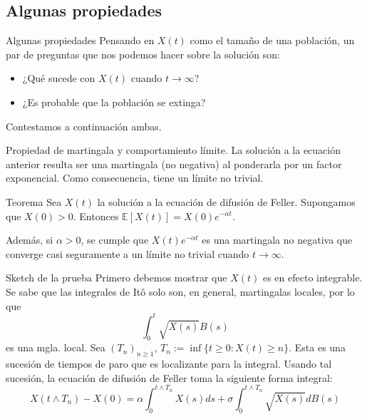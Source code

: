 \documentclass{beamer}
\renewcommand{\to}{\rightarrow}
\newcommand{\E}{\mathbb{E}}
\renewcommand{\1}{\mathds{1}}
\theoremstyle{definition}
\theoremstyle{definition}
\theoremstyle{definition}
\theoremstyle{definition}
\theoremstyle{definition}
\begin{document}
\subsection[Algunas propiedades]{Algunas propiedades}
\begin{frame}{Algunas propiedades}
    Pensando en $X(t)$ como el tamaño de una población, un par de preguntas que nos podemos hacer 
    sobre la solución son:
    \newline

    \begin{itemize}
        \item ¿Qué sucede con $X(t)$ cuando $t\to \infty$?
        \item ¿Es probable que la población se extinga?
        \newline

    \end{itemize}

    Contestamos a continuación ambas.
\end{frame}
\begin{frame}{Propiedad de martingala y comportamiento límite.}
    La solución a la ecuación anterior resulta ser una martingala (no negativa) al ponderarla
    por un factor exponencial. Como consecuencia, tiene un límite no trivial.
    \newline

    \begin{block}{Teorema}
        Sea $X(t)$ la solución a la ecuación de difusión de Feller. Supongamos que $X(0)>0$. Entonces 
        $\E\left[X(t)\right]=X(0)e^{-\alpha t}$.
        \newline

        Además, si $\alpha>0$, se cumple que $X(t)e^{-\alpha t}$ es una martingala 
        no negativa que converge casi seguramente a un límite no trivial cuando $t\longrightarrow \infty$.
    \end{block}
\end{frame}
\begin{frame}{Sketch de la prueba}
    Primero debemos mostrar que $X(t)$ es en efecto integrable. Se sabe que las integrales de Itô solo son, en general, 
    martingalas locales, por lo que 
    \[
        \int_{0}^{t} \sqrt{X(s)}B(s)
    \]
    es una mgla. local. Sea $(T_n)_{n\geq1}$, $T_n:=\inf\{t\geq0:X(t)\geq n\}$. Esta es una sucesión de 
    tiempos de paro que es localizante para la integral. Usando tal sucesión, la ecuación de difusión de 
    Feller toma la siguiente forma integral:
    \[
    X(t\wedge T_n)-X(0)=\alpha\int_0^{t\wedge T_n}X(s)ds+\sigma\int_{0}^{t\wedge T_n}\sqrt{X(s)}dB(s)    
    \]
\end{frame}
\end{document}
